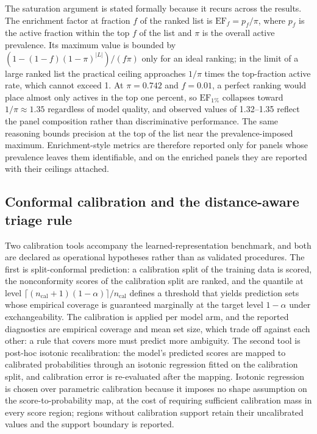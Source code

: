 The saturation argument is stated formally because it recurs across the results. The enrichment factor at fraction $f$ of the ranked list is $\mathrm{EF}_f = p_f / \pi$, where $p_f$ is the active fraction within the top $f$ of the list and $\pi$ is the overall active prevalence. Its maximum value is bounded by $(1 - (1-f)(1-\pi)^{|L|}) / (f\pi)$ only for an ideal ranking; in the limit of a large ranked list the practical ceiling approaches $1/\pi$ times the top-fraction active rate, which cannot exceed \num{1}. At $\pi = \num{0.742}$ and $f = \num{0.01}$, a perfect ranking would place almost only actives in the top one percent, so $\mathrm{EF}_{1\%}$ collapses toward $1/\pi \approx \num{1.35}$ regardless of model quality, and observed values of \numrange{1.32}{1.35} reflect the panel composition rather than discriminative performance. The same reasoning bounds precision at the top of the list near the prevalence-imposed maximum. Enrichment-style metrics are therefore reported only for panels whose prevalence leaves them identifiable, and on the enriched panels they are reported with their ceilings attached.

\subsection{Conformal calibration and the distance-aware triage rule}

Two calibration tools accompany the learned-representation benchmark, and both are declared as operational hypotheses rather than as validated procedures. The first is split-conformal prediction: a calibration split of the training data is scored, the nonconformity scores of the calibration split are ranked, and the quantile at level $\lceil (n_{\mathrm{cal}} + 1)(1 - \alpha) \rceil / n_{\mathrm{cal}}$ defines a threshold that yields prediction sets whose empirical coverage is guaranteed marginally at the target level $1 - \alpha$ under exchangeability. The calibration is applied per model arm, and the reported diagnostics are empirical coverage and mean set size, which trade off against each other: a rule that covers more must predict more ambiguity. The second tool is post-hoc isotonic recalibration: the model's predicted scores are mapped to calibrated probabilities through an isotonic regression fitted on the calibration split, and calibration error is re-evaluated after the mapping. Isotonic regression is chosen over parametric calibration because it imposes no shape assumption on the score-to-probability map, at the cost of requiring sufficient calibration mass in every score region; regions without calibration support retain their uncalibrated values and the support boundary is reported.

